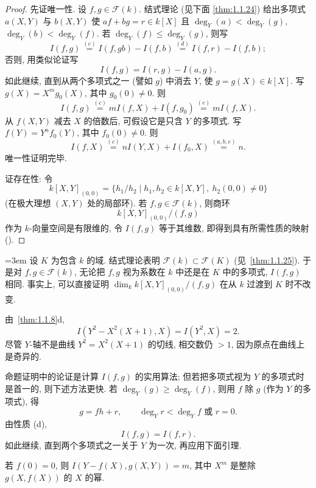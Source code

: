 \begin{proof}
先证唯一性. 设 $f,g\in\mathcal{F}(k)$. 结式理论 (见下面 \ref{thm:1.1.24}) 给出多项式 $a(X,Y)$ 与 $b(X,Y)$ 使 $af + bg = r\in k[X]$ 且 $\deg_Y(a) < \deg_Y(g)$, $\deg_Y(b) < \deg_Y(f)$. 若 $\deg_Y(f)\le\deg_Y(g)$, 则写
\[
I(f,g) \overset{(c)}{=} I(f,gb) - I(f,b) \overset{(d)}{=} I(f,r) - I(f,b);
\]
否则, 用类似论证写
\[
I(f,g) = I(r,g) - I(a,g).
\]
如此继续, 直到从两个多项式之一 (譬如 $g$) 中消去 $Y$, 使 $g = g(X)\in k[X]$. 写 $g(X) = X^m g_0(X)$, 其中 $g_0(0)\neq 0$. 则
\[
I(f,g) \overset{(c)}{=} mI(f,X) + I(f,g_0) \overset{(e)}{=} mI(f,X).
\]
从 $f(X,Y)$ 减去 $X$ 的倍数后, 可假设它是只含 $Y$ 的多项式. 写 $f(Y) = Y^n f_0(Y)$, 其中 $f_0(0)\neq 0$. 则
\[
I(f,X) \overset{(c)}{=} nI(Y,X) + I(f_0,X) \overset{(a,b,e)}{=} n.
\]
唯一性证明完毕.

证存在性: 令
\[
k[X,Y]_{(0,0)} = \{h_1/h_2 \mid h_1,h_2\in k[X,Y],\ h_2(0,0)\neq 0\}
\]
(在极大理想 $(X,Y)$ 处的局部环). 若 $f,g\in\mathcal{F}(k)$, 则商环
\[
k[X,Y]_{(0,0)}/(f,g)
\]
作为 $k$-向量空间是有限维的, 令 $I(f,g)$ 等于其维数, 即得到具有所需性质的映射 (\cite[\S3.3]{fulton1969}).
\end{proof}

\begin{remark} \label{thm:1.1.9} 
{\emergencystretch=3em 设 $K$ 为包含 $k$ 的域. 结式理论表明 $\mathcal{F}(k)\subset\mathcal{F}(K)$ (见~\ref{thm:1.1.25}). 于是对 $f,g\in\mathcal{F}(k)$, 无论把 $f,g$ 视为系数在 $k$ 中还是在 $K$ 中的多项式, $I(f,g)$ 相同. 事实上, 可以直接证明 $\dim_k k[X,Y]_{(0,0)}/(f,g)$ 在从 $k$ 过渡到 $K$ 时不改变.\par}
\end{remark}

\begin{example} \label{thm:1.1.10} 
由~\ref{thm:1.1.8}d,
\[
I(Y^2 - X^2(X+1), X) = I(Y^2, X) = 2.
\]
尽管 $Y$-轴不是曲线 $Y^2 = X^2(X+1)$ 的切线, 相交数仍 $> 1$, 因为原点在曲线上是奇异的.
\end{example}

命题证明中的论证是计算 $I(f,g)$ 的实用算法; 但若把多项式视为 $Y$ 的多项式时是首一的, 则下述方法更快. 若 $\deg_Y(g)\ge\deg_Y(f)$, 则用 $f$ 除 $g$ (作为 $Y$ 的多项式), 得
\[
g = fh + r, \qquad \deg_Y r < \deg_Y f \text{ 或 } r = 0.
\]
由性质 (d),
\[
I(f,g) = I(f,r).
\]
如此继续, 直到两个多项式之一关于 $Y$ 为一次, 再应用下面引理.

\begin{lemma} \label{thm:1.1.11} 
若 $f(0) = 0$, 则 $I(Y - f(X), g(X,Y)) = m$, 其中 $X^m$ 是整除 $g(X, f(X))$ 的 $X$ 的幂.
\end{lemma}

